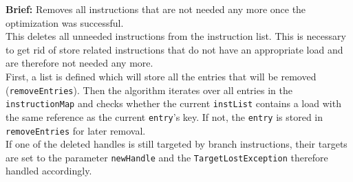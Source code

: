 \textbf{Brief: }Removes all instructions that are not needed any more once the optimization was successful. \\

This deletes all unneeded instructions from the instruction list. This is necessary to get rid of store related instructions that do not have an appropriate load and are therefore not needed any more. \\
First, a list is defined which will store all the entries that will be removed (\texttt{removeEntries}). Then the algorithm iterates over all entries in the \texttt{instructionMap} and checks whether the current \texttt{instList} contains a load with the same reference as the current \texttt{entry}’s key. If not, the \texttt{entry} is stored in \texttt{removeEntries} for later removal.\\
If one of the deleted handles is still targeted by branch instructions, their targets are set to the parameter \texttt{newHandle} and the \texttt{TargetLostException} therefore handled accordingly.